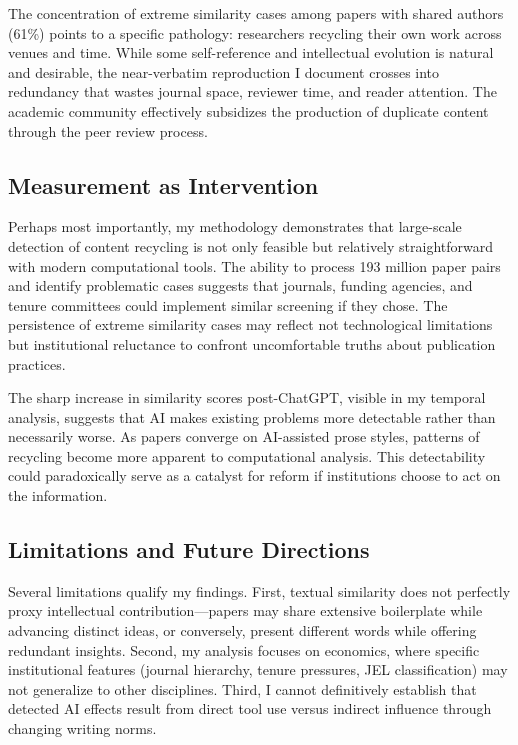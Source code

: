 \documentclass[12pt]{article}
\begin{document}
The concentration of extreme similarity cases among papers with shared authors (61\%) points to a specific pathology: researchers recycling their own work across venues and time. While some self-reference and intellectual evolution is natural and desirable, the near-verbatim reproduction I document crosses into redundancy that wastes journal space, reviewer time, and reader attention. The academic community effectively subsidizes the production of duplicate content through the peer review process.

\subsection{Measurement as Intervention}

Perhaps most importantly, my methodology demonstrates that large-scale detection of content recycling is not only feasible but relatively straightforward with modern computational tools. The ability to process 193 million paper pairs and identify problematic cases suggests that journals, funding agencies, and tenure committees could implement similar screening if they chose. The persistence of extreme similarity cases may reflect not technological limitations but institutional reluctance to confront uncomfortable truths about publication practices.

The sharp increase in similarity scores post-ChatGPT, visible in my temporal analysis, suggests that AI makes existing problems more detectable rather than necessarily worse. As papers converge on AI-assisted prose styles, patterns of recycling become more apparent to computational analysis. This detectability could paradoxically serve as a catalyst for reform if institutions choose to act on the information.

\subsection{Limitations and Future Directions}

Several limitations qualify my findings. First, textual similarity does not perfectly proxy intellectual contribution—papers may share extensive boilerplate while advancing distinct ideas, or conversely, present different words while offering redundant insights. Second, my analysis focuses on economics, where specific institutional features (journal hierarchy, tenure pressures, JEL classification) may not generalize to other disciplines. Third, I cannot definitively establish that detected AI effects result from direct tool use versus indirect influence through changing writing norms.
\end{document}
